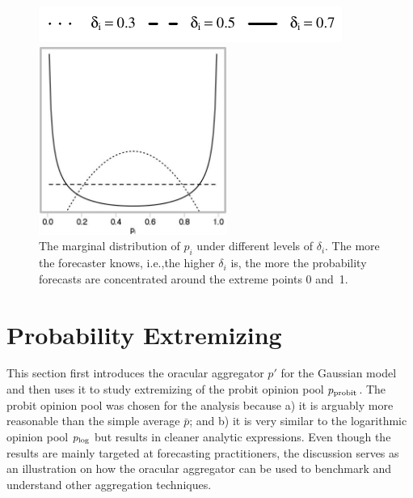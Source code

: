 \documentclass[11pt]{article}
\theoremstyle{definition}
\theoremstyle{definition}
\def\probit{p_{\rm probit}}
\def\plog{p_{\rm log}}
\begin{document}
\begin{figure}[t]
\centering
	\hspace{0em}\includegraphics{LegendMarginal}

 \includegraphics[width= 0.55\textwidth]{Marginals}
   \caption{The marginal distribution of $p_i$ under different levels of 
$\delta_i$.  The more the forecaster knows, i.e.,the higher $\delta_i$ is, 
the more the probability forecasts are concentrated around the extreme 
points 0 and~1.}
\label{marginals}
\end{figure}

\section{Probability Extremizing}
\label{extremizing}
This section first introduces the oracular aggregator $p'$ for the
Gaussian model and then uses it to study
extremizing of the probit opinion pool $\probit$. The probit opinion 
pool  was chosen for the analysis because a) it is arguably more
reasonable than the simple average $\bar{p}$; and b) it is very
similar to the logarithmic opinion pool $\plog$ but results in cleaner
analytic expressions. Even though the results are mainly targeted at forecasting practitioners, the discussion serves as an illustration on how the oracular aggregator can be used to benchmark and understand other aggregation techniques. 
\end{document}
